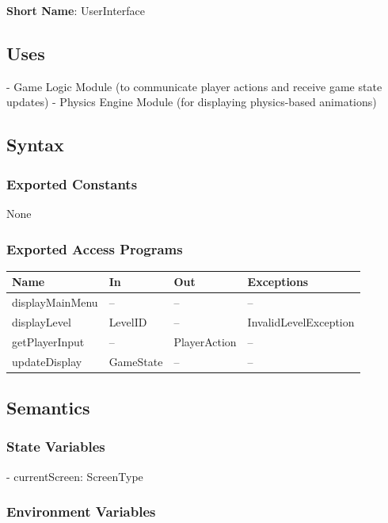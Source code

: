 \documentclass[12pt]{article}
\begin{document}
\textbf{Short Name}: UserInterface

\subsection{Uses}

- Game Logic Module (to communicate player actions and receive game state updates)
- Physics Engine Module (for displaying physics-based animations)

\subsection{Syntax}

\subsubsection{Exported Constants}

None

\subsubsection{Exported Access Programs}

\begin{tabular}{|l|l|l|l|}
\hline
\textbf{Name} & \textbf{In} & \textbf{Out} & \textbf{Exceptions} \\
\hline
displayMainMenu & -- & -- & -- \\
\hline
displayLevel & LevelID & -- & InvalidLevelException \\
\hline
getPlayerInput & -- & PlayerAction & -- \\
\hline
updateDisplay & GameState & -- & -- \\
\hline
\end{tabular}

\subsection{Semantics}

\subsubsection{State Variables}

- currentScreen: ScreenType

\subsubsection{Environment Variables}
\end{document}
